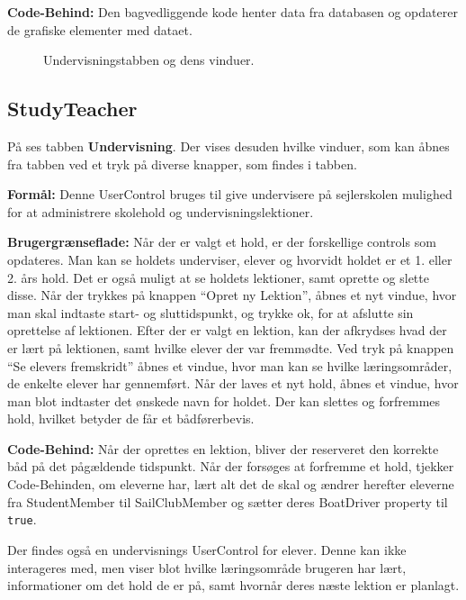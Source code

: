 \textbf{Code-Behind:}
Den bagvedliggende kode henter data fra databasen og opdaterer de grafiske elementer med dataet.


\begin{center}
    \begin{figure}[H]
        \caption{Undervisningstabben og dens vinduer.}
        \label{img:undervisning}
        \vspace{-40pt}
    \end{figure}
\end{center}

\subsection{StudyTeacher}

På  ses tabben \textbf{Undervisning}. 
Der vises desuden hvilke vinduer, som kan åbnes fra tabben ved et tryk på diverse knapper, som findes i tabben.


\textbf{Formål:}
Denne UserControl bruges til give undervisere på sejlerskolen mulighed for at administrere skolehold og undervisningslektioner.

\textbf{Brugergrænseflade:}
Når der er valgt et hold, er der forskellige controls som opdateres.
Man kan se holdets underviser, elever og hvorvidt holdet er et 1. eller 2. års hold. 
Det er også muligt at se holdets lektioner, samt oprette og slette disse.
Når der trykkes på knappen ``Opret ny Lektion'', åbnes et nyt vindue, hvor man skal indtaste start- og sluttidspunkt, og trykke ok, for at afslutte sin oprettelse af lektionen.
Efter der er valgt en lektion, kan der afkrydses hvad der er lært på lektionen, samt hvilke elever der var fremmødte.
Ved tryk på knappen ``Se elevers fremskridt'' åbnes et vindue, hvor man kan se hvilke læringsområder, de enkelte elever har gennemført.
Når der laves et nyt hold, åbnes et vindue, hvor man blot indtaster det ønskede navn for holdet.
Der kan slettes og forfremmes hold, hvilket betyder de får et bådførerbevis.

\textbf{Code-Behind:}
Når der oprettes en lektion, bliver der reserveret den korrekte båd på det pågældende tidspunkt.
Når der forsøges at forfremme et hold, tjekker Code-Behinden, om eleverne har, lært alt det de skal og ændrer herefter eleverne fra StudentMember til SailClubMember og sætter deres BoatDriver property til \texttt{true}.

Der findes også en undervisnings UserControl for elever. 
Denne kan ikke interageres med, men viser blot hvilke læringsområde brugeren har lært, informationer om det hold de er på, samt hvornår deres næste lektion er planlagt.


